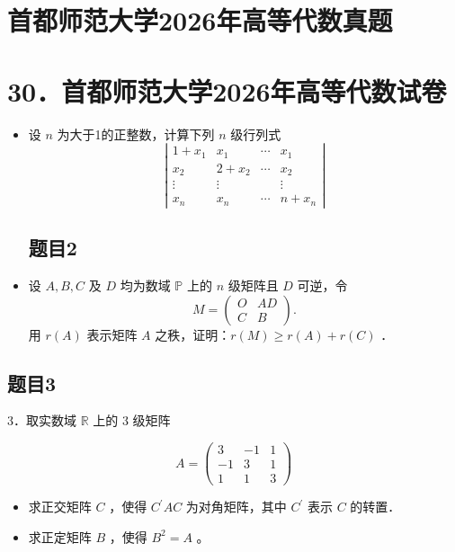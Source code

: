\documentclass{article}
\begin{document}
\section*{首都师范大学2026年高等代数真题}
\section*{30．首都师范大学2026年高等代数试卷}
\begin{itemize}

\subsection{题目1}
  \item[1．] 设 \(n\) 为大于1的正整数，计算下列 \(n\) 级行列式
\[
\left|\begin{array}{cccc}
1+x_{1} & x_{1} & \cdots & x_{1} \\
x_{2} & 2+x_{2} & \cdots & x_{2} \\
\vdots & \vdots & & \vdots \\
x_{n} & x_{n} & \cdots & n+x_{n}
\end{array}\right|
\]

\subsection{题目2}
  \item[2．] 设 \(A, B, C\) 及 \(D\) 均为数域 \(\mathbb{P}\) 上的 \(n\) 级矩阵且 \(D\) 可逆，令
\[
M=\left(\begin{array}{cc}
O & A D \\
C & B
\end{array}\right) .
\]
用 \(r(A)\) 表示矩阵 \(A\) 之秩，证明：\(r(M) \geq r(A)+r(C)\) ．
\end{itemize}

\subsection{题目3}
3．取实数域 \(\mathbb{R}\) 上的 3 级矩阵

\[
A=\left(\begin{array}{ccc}
3 & -1 & 1 \\
-1 & 3 & 1 \\
1 & 1 & 3
\end{array}\right)
\]

\begin{itemize}
  \item[（1）] 求正交矩阵 \(C\) ，使得 \(C^{\prime} A C\) 为对角矩阵，其中 \(C^{\prime}\) 表示 \(C\) 的转置．
  \item[（2）] 求正定矩阵 \(B\) ，使得 \(B^{2}=A\) 。
\end{itemize}
\end{document}
